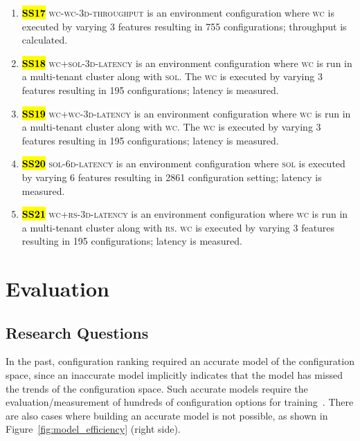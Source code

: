 \documentclass[sigconf]{acmart}
\DeclareRobustCommand{\hlred}[1]{{\sethlcolor{Myred}\textbf{\textcolor{white}{\hl{#1}}}}}
\begin{document}
\begin{enumerate}
    \item \hlred{SS17} \textsc{\textsc{wc}-\textsc{wc}-3d-throughput} is an environment configuration where \textsc{wc} is executed by varying 3 features resulting in 755 configurations; throughput is calculated.
    
    \item \hlred{SS18} \textsc{\textsc{wc}+\textsc{sol}-3d-latency} is an environment configuration where \textsc{wc} is run in a multi-tenant cluster along with \textsc{sol}. The \textsc{wc} is executed by varying 3 features resulting in 195 configurations; latency is measured.
    
    \item \hlred{SS19} \textsc{\textsc{wc}+\textsc{wc}-3d-latency} is an environment configuration where \textsc{wc} is run in a multi-tenant cluster along with \textsc{wc}. The \textsc{wc} is executed by varying 3 features resulting in 195 configurations; latency is measured.
    
    
    \item \hlred{SS20} \textsc{\textsc{sol}-6d-latency} is an environment configuration where \textsc{sol} is executed by varying 6 features resulting in 2861 configuration setting; latency is measured.
    
    \item \hlred{SS21} \textsc{\textsc{wc}+\textsc{rs}-3d-latency} is an environment configuration where \textsc{wc} is run in a multi-tenant cluster along with \textsc{rs}. \textsc{wc} is executed by varying 3 features resulting in 195 configurations; latency is measured.
    
    
    
    
\end{enumerate}

\section{Evaluation}
\subsection{Research Questions}
In the past, configuration ranking required an accurate model of the configuration space, since an inaccurate model implicitly indicates that the model has missed the trends of the configuration space. Such accurate models require the evaluation/measurement of hundreds of configuration options for training~\cite{siegmund2012predicting, guo2013variability, sarkar2015cost}. There are also cases where building an accurate model is not possible, as shown in Figure~\ref{fig:model_efficiency} (right side). 
\end{document}

